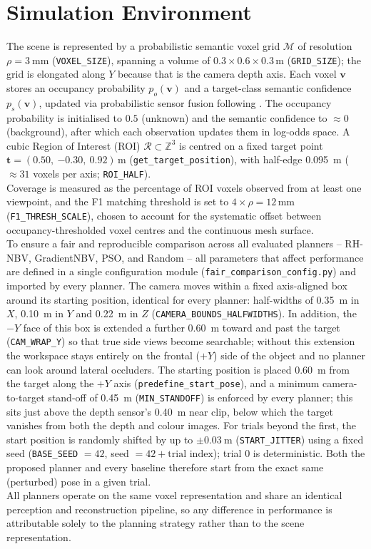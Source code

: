 \section{Simulation Environment}

The scene is represented by a probabilistic semantic voxel grid $\mathcal{M}$
of resolution $\rho = \SI{3}{\milli\metre}$ (\texttt{VOXEL\_SIZE}), spanning a
volume of $0.3 \times 0.6 \times 0.3$\,m (\texttt{GRID\_SIZE}); the grid is
elongated along $Y$ because that is the camera depth axis. Each voxel
$\mathbf{v}$ stores an occupancy probability $p_o(\mathbf{v})$ and a
target-class semantic confidence $p_s(\mathbf{v})$, updated via probabilistic
sensor fusion following \citet{burusa2024}. The occupancy probability is
initialised to $0.5$ (unknown) and the semantic confidence to $\approx 0$
(background), after which each observation updates them in log-odds space. A
cubic Region of Interest (ROI) $\mathcal{R}\subset\mathbb{Z}^3$ is centred on
a fixed target point $\mathbf{t} = (0.50,\ {-0.30},\ 0.92)$\,m
(\texttt{get\_target\_position}), with half-edge \SI{0.095}{\metre}
($\approx 31$ voxels per axis; \texttt{ROI\_HALF}).\\

Coverage is measured as the percentage of ROI voxels observed from at least
one viewpoint, and the F1 matching threshold is set to $4 \times \rho = 12$\,mm
(\texttt{F1\_THRESH\_SCALE}), chosen to account for the systematic offset
between occupancy-thresholded voxel centres and the continuous mesh surface.\\

To ensure a fair and reproducible comparison across all evaluated planners --
RH-NBV, GradientNBV, PSO, and Random -- all parameters that affect performance
are defined in a single configuration module
(\texttt{fair\_comparison\_config.py}) and imported by every planner. The
camera moves within a fixed axis-aligned box around its starting position,
identical for every planner: half-widths of \SI{0.35}{\metre} in $X$,
\SI{0.10}{\metre} in $Y$ and \SI{0.22}{\metre} in $Z$
(\texttt{CAMERA\_BOUNDS\_HALFWIDTHS}). In addition, the $-Y$ face of this box
is extended a further \SI{0.60}{\metre} toward and past the target
(\texttt{CAM\_WRAP\_Y}) so that true side views become searchable; without
this extension the workspace stays entirely on the frontal ($+Y$) side of the
object and no planner can look around lateral occluders. The starting position
is placed \SI{0.60}{\metre} from the target along the $+Y$ axis
(\texttt{predefine\_start\_pose}), and a minimum camera-to-target stand-off of
\SI{0.45}{\metre} (\texttt{MIN\_STANDOFF}) is enforced by every planner; this
sits just above the depth sensor's \SI{0.40}{\metre} near clip, below which
the target vanishes from both the depth and colour images. For trials beyond
the first, the start position is randomly shifted by up to $\pm\SI{0.03}{\metre}$
(\texttt{START\_JITTER}) using a fixed seed
(\texttt{BASE\_SEED} $= 42$, seed $= 42 + \text{trial index}$); trial $0$ is
deterministic. Both the proposed planner and every baseline therefore start
from the exact same (perturbed) pose in a given trial.\\

All planners operate on the same voxel representation and share an identical
perception and reconstruction pipeline, so any difference in performance is
attributable solely to the planning strategy rather than to the scene
representation.
